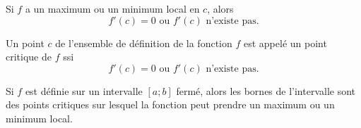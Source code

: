 \documentclass[a4paper,12pt]{article}
\begin{document}
\begin{figure}[h!]
\begin{subfigure}[b]{0.48\textwidth}
\end{subfigure}

\end{figure}
\begin{thm}
	\tcblower
	Si $f$ a un maximum ou un minimum local en $c$, alors
	\[f'(c)=0 \text{ ou } f'(c) \text{ n'existe pas.}\]
\end{thm}

\begin{definition}
	\tcblower
	Un point $c$ de l'ensemble de définition de la fonction $f$ est appelé un point critique de $f$ ssi
	\[f'(c)=0 \text{ ou } f'(c) \text{ n'existe pas.}\]
\end{definition}
\begin{remarque}
	\tcblower
	Si $f$ est définie sur un intervalle $[a;b]$ fermé, alors les bornes de l'intervalle sont des points critiques sur lesquel la fonction peut prendre un maximum ou un minimum local. 
\end{remarque}
\end{document}
